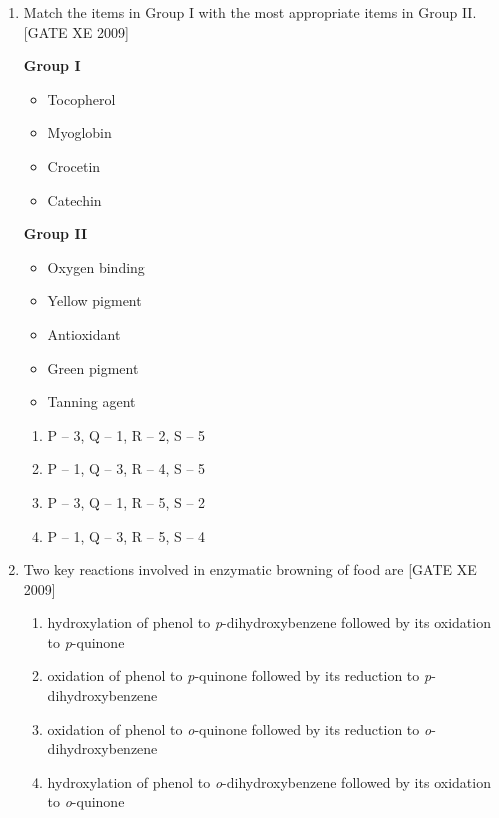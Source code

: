 \documentclass[journal,12pt,onecolumn]{IEEEtran}
\theoremstyle{remark}
\begin{document}
\begin{enumerate}
\item Match the items in Group I with the most appropriate items in Group II.\hfill[GATE XE 2009]

\begin{minipage}[t]{0.45\textwidth}
\textbf{Group I}
\begin{itemize}
  \item[P.] Tocopherol
  \item[Q.] Myoglobin
  \item[R.] Crocetin
  \item[S.] Catechin
\end{itemize}
\end{minipage}
\hfill
\begin{minipage}[t]{0.45\textwidth}
\textbf{Group II}
\begin{itemize}
  \item[1.] Oxygen binding
  \item[2.] Yellow pigment
  \item[3.] Antioxidant
  \item[4.] Green pigment
  \item[5.] Tanning agent
\end{itemize}
\end{minipage}



\begin{multicols}{2}
\begin{enumerate}
\item P -- 3, Q -- 1, R -- 2, S -- 5
\item P -- 1, Q -- 3, R -- 4, S -- 5
\item P -- 3, Q -- 1, R -- 5, S -- 2
\item P -- 1, Q -- 3, R -- 5, S -- 4
\end{enumerate}
\end{multicols}

\item Two key reactions involved in enzymatic browning of food are
\hfill[GATE XE 2009]
\begin{multicols}{2}
\begin{enumerate}
\item hydroxylation of phenol to \textit{p}-dihydroxybenzene followed by its oxidation to \textit{p}-quinone
\item oxidation of phenol to \textit{p}-quinone followed by its reduction to \textit{p}-dihydroxybenzene
\item oxidation of phenol to \textit{o}-quinone followed by its reduction to \textit{o}-dihydroxybenzene
\item hydroxylation of phenol to \textit{o}-dihydroxybenzene followed by its oxidation to \textit{o}-quinone
\end{enumerate}
\end{multicols}


\end{enumerate}
\end{document}
